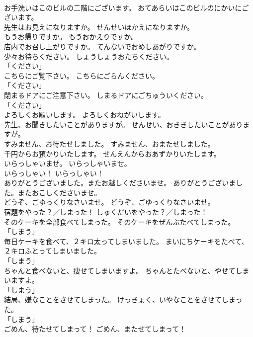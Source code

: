 \documentclass[8pt]{extreport}
\begin{document}
\begin{CJK}{UTF8}{min}
\\	お手洗いはこのビルの二階にございます。	おてあらいはこのビルのにかいにございます。	
\\	先生はお見えになりますか。	せんせいほかえになりますか。	
\\	もうお帰りですか。	もうおかえりですか。	
\\	店内でお召し上がりですか。	てんないでおめしあがりですか。	
\\	少々お待ちください。	しょうしょうおたちください。	
\\	「ください」 
\\	こちらにご覧下さい。	こちらにごらんください。	
\\	「ください」 
\\	閉まるドアにご注意下さい。	しまるドアにごちゅういください。	
\\	「ください」 
\\	よろしくお願いします。	よろしくおねがいします。	
\\	先生、お聞きしたいことがありますが。	せんせい、おききしたいことがありますが。	
\\	すみません、お待たせしました。	すみません、おまたせしました。	
\\	千円からお預かりいたします。	せんえんからおあずかりいたします。	
\\	いらっしゃいませ。	いらっしゃいませ。	
\\	いらっしゃい！	いらっしゃい！	
\\	ありがとうございました。またお越しくださいませ。	ありがとうございました。またおこしくださいませ。	
\\	どうぞ、ごゆっくりなさいませ。	どうぞ、ごゆっくりなさいませ。	
\\	宿題をやった？／しまった！	しゅくだいをやった？／しまった！	
\\	そのケーキを全部食べてしまった。	そのケーキをぜんぶたべてしまった。	
\\	「しまう」 
\\	毎日ケーキを食べて、２キロ太ってしまいました。	まいにちケーキをたべて、２キロふとってしまいました。	
\\	「しまう」 
\\	ちゃんと食べないと、痩せてしまいますよ。	ちゃんとたべないと、やせてしまいますよ。	
\\	「しまう」 
\\	結局、嫌なことをさせてしまった。	けっきょく、いやなことをさせてしまった。	
\\	「しまう」 
\\	ごめん、待たせてしまって！	ごめん、またせてしまって！	

\end{CJK}
\end{document}
